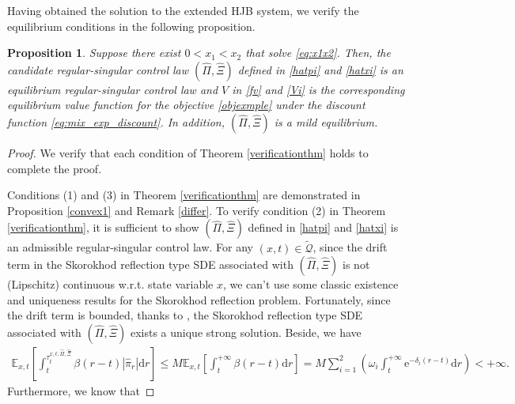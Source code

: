 \documentclass[11pt,reqno]{article}%
\newtheorem{proposition}[theorem]{Proposition}
\numberwithin{equation}{section}
\begin{document}
Having obtained the solution to the extended HJB system, we verify the equilibrium conditions in the following proposition.
\begin{proposition}\label{equilver}
Suppose there exist  $0 < x_1 < x_2$ that solve \eqref{eq:x1x2}. Then, the candidate regular-singular control law $\left(\hat\Pi,\hat\Xi\right)$ defined in \eqref{hatpi} and \eqref{hatxi} is an equilibrium regular-singular control law	  and $V$ in \eqref{fv} and \eqref{Vi} is the corresponding equilibrium value function for the objective \eqref{objexmple} under the discount function \eqref{eq:mix_exp_discount}. In addition, $\left(\hat\Pi,\hat\Xi\right)$ is a mild equilibrium.
 \end{proposition}
\begin{proof}
 We verify that each condition of Theorem \ref{verificationthm} holds to complete the proof.
 
 Conditions (1) and (3) in Theorem \ref{verificationthm} are demonstrated in Proposition \ref{convex1} and Remark \ref{differ}. To verify condition (2) in Theorem \ref{verificationthm}, it is sufficient to show $\left(\hat\Pi,\hat\Xi\right)$ defined in \eqref{hatpi} and \eqref{hatxi} is an admissible regular-singular control law. For any $(x,t)\in \mathcal{\tilde{Q}}$, since the drift term in the Skorokhod reflection type SDE associated with $\left(\hat\Pi,\hat\Xi\right)$ is not (Lipschitz) continuous w.r.t. state variable $x$, we can't use some classic existence and uniqueness results for the Skorokhod reflection problem. Fortunately, since the drift term is bounded, thanks to \citet[Theorem 3.1]{ZHANG1994135}, the Skorokhod reflection type SDE associated with $\left(\hat\Pi,\hat\Xi\right)$ exists a unique strong solution. Beside, we have 
\begin{equation}
\begin{aligned}
\mathbb{E}_{x, t}\left[\int_t^{\tau^{x,t;\hat\Pi,\hat\Xi}_{t}} \beta(r-t) \left|\hat\pi_r\right| \mathrm{d} r\right]\le M\mathbb{E}_{x, t}\left[\int_t^{+\infty} \beta(r-t)  \mathrm{d} r\right]=M\sum\limits_{i=1}^{2}\left(\omega_i\int_t^{+\infty} \mathrm{e}^{-\delta_i (r-t)}  \mathrm{d} r\right)<+\infty. 
\end{aligned}\nonumber
\end{equation}
Furthermore, we know that


\end{proof}
\end{document}
